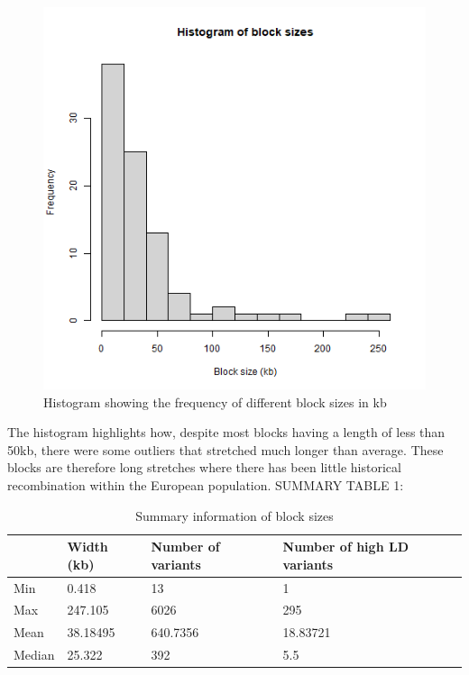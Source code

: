 \documentclass{article}
\begin{document}
\newpage
\begin{figure}[h]
    \centering
    \includegraphics[width=1\linewidth]{Thesis/thesis images/blockhistogram.png}
    \caption{Histogram showing the frequency of different block sizes in kb}
    \label{fig:enter-label}
\end{figure}
The histogram highlights how, despite most blocks having a length of less than 50kb, there were some outliers that stretched much longer than average. These blocks are therefore long stretches where there has been little historical recombination within the European population.
SUMMARY TABLE 1:
\begin{table}[h]
\begin{tabular}{|l|l|l|l|}
\hline
       & Width (kb) & Number of variants & Number of high LD variants \\ \hline
Min    & 0.418      & 13                 & 1                          \\ \hline
Max    & 247.105    & 6026               & 295                        \\ \hline
Mean   & 38.18495   & 640.7356           & 18.83721                   \\ \hline
Median & 25.322     & 392                & 5.5                        \\ \hline
\end{tabular}
\caption{Summary information of block sizes}
\end{table}
\end{document}
